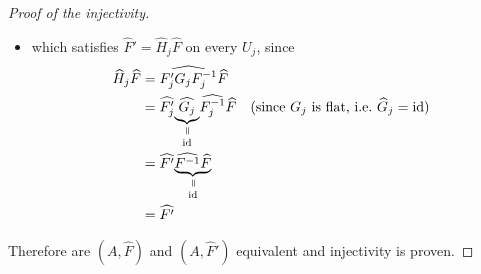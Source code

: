 \begin{proof}[Proof of the injectivity]
\begin{itemize}
    \item which satisfies $\hat F'=\hat H_j\hat F$ on every $U_j$, since
      \begin{align*}
        \hat H_j\hat F&= \widehat{F_j'G_{j}F_j^{-1}} \hat F
        \\&= \hat{F_j'}
        \underset{\id}{%
          \underset{\text{\rotatebox[origin=c]{-90}{$=$}}}{%
            \underbrace{%
              \hat{G_{j}}
            }
          }
        }
        \hat{F_j^{-1}} \hat F
        & \text{(since $G_j$ is flat, i.e.\ $\hat G_j=\id$)}
        \\&= \hat{F'}
        \underset{\id}{%
          \underset{\text{\rotatebox[origin=c]{-90}{$=$}}}{%
            \underbrace{%
              \hat{F^{-1}} \hat F
            }
          }
        }
        \\&= \hat{F'}
      \end{align*}
  \end{itemize}
  Therefore are $(A,\hat F)$ and $(A,\hat F')$ equivalent and injectivity is
  proven.
  \iffalse
    \begin{comment}
      \textbf{First look at injectivity:}
      Consider the two elements $(\cM,\nabla,\hat f)$ and $(\cM',\nabla',\hat
      f')$ of $\cH$ which map to same cohomology class
      \[
        \exp((\cM,\nabla,\hat f))=\lambda=\exp((\cM',\nabla',\hat f'))
          \in H^1(S^1;\Lambda(A^0)) \,.
      \]
      Since we can use refined coverings, it is possible to find a finite
      covering $\cU=\{U_j;j\in J\}$ of $S^1$ such that $\lambda$ is the class
      of the cocycles $(f_lf_j^{-1})$ and $(f_l',f_j'^{-1})$, where

\end{comment}
\end{proof}
